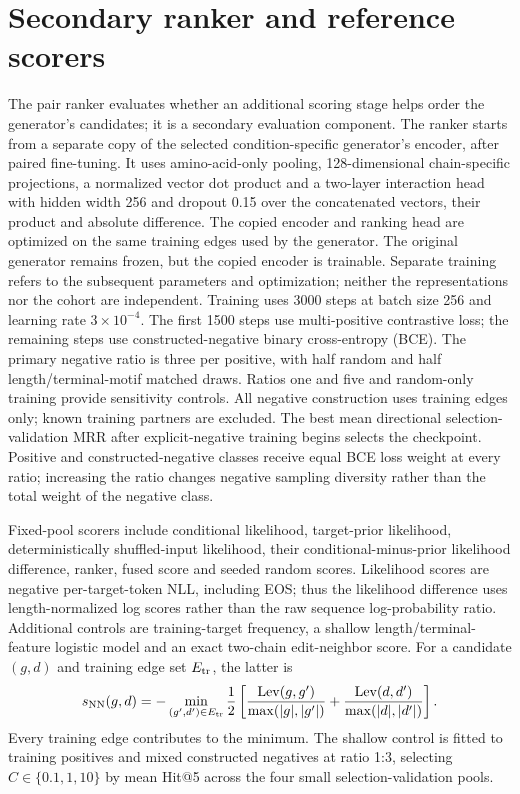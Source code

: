 \documentclass[a4paper,11pt]{article}
\begin{document}
\section{Secondary ranker and reference scorers}
The pair ranker evaluates whether an additional scoring stage helps order the
generator's candidates; it is a secondary evaluation component.
The ranker starts from a separate copy of the selected condition-specific
generator's encoder, after paired fine-tuning. It uses amino-acid-only pooling,
128-dimensional chain-specific projections, a normalized vector dot product
and a two-layer interaction head with hidden width 256 and dropout 0.15 over
the concatenated vectors, their product and absolute difference. The copied encoder and ranking head are optimized on the same training edges
used by the generator. The original generator remains frozen, but the copied
encoder is trainable. Separate training refers to the subsequent parameters
and optimization; neither the representations nor the cohort are independent. Training uses 3000 steps
at batch size 256 and learning rate $3\times10^{-4}$. The first 1500 steps use
multi-positive contrastive loss; the remaining steps use constructed-negative
binary cross-entropy (BCE). The primary negative ratio is three per positive, with
half random and half length/terminal-motif matched draws. Ratios one and five
and random-only training provide sensitivity controls. All negative construction
uses training edges only; known training partners are excluded. The best mean
directional selection-validation MRR after explicit-negative training begins
selects the checkpoint.
Positive and constructed-negative classes receive equal BCE loss weight at
every ratio; increasing the ratio changes negative sampling diversity rather
than the total weight of the negative class.

Fixed-pool scorers include conditional likelihood, target-prior likelihood,
deterministically shuffled-input likelihood, their conditional-minus-prior
likelihood difference, ranker, fused score and seeded random scores.
Likelihood scores are negative per-target-token NLL, including EOS; thus the
likelihood difference uses length-normalized log scores rather than the raw
sequence log-probability ratio. Additional
controls are training-target frequency, a shallow length/terminal-feature
logistic model and an exact two-chain edit-neighbor score. For a candidate
$(g,d)$ and training edge set $E_{\rm tr}$, the latter is
\begin{equation}
s_{\rm NN}(g,d)=-\min_{(g',d')\in E_{\rm tr}}
\frac{1}{2}\left[
\frac{\operatorname{Lev}(g,g')}{\max(|g|,|g'|)}+
\frac{\operatorname{Lev}(d,d')}{\max(|d|,|d'|)}\right].
\end{equation}
Every training edge contributes to the minimum. The shallow control is fitted
to training positives and mixed constructed negatives at ratio 1:3, selecting
$C\in\{0.1,1,10\}$ by mean Hit@5 across the four small selection-validation pools.
\end{document}
